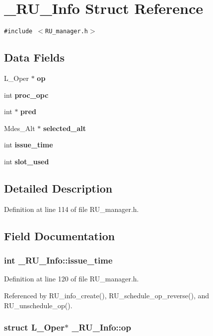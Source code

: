 \section{\_\-RU\_\-Info Struct Reference}
\label{struct__RU__Info}
{\tt \#include $<$RU\_\-manager.h$>$}

\subsection*{Data Fields}
\begin{CompactItemize}
\item 
L\_\-Oper $\ast$ \bf{op}
\item 
int \bf{proc\_\-opc}
\item 
int $\ast$ \bf{pred}
\item 
Mdes\_\-Alt $\ast$ \bf{selected\_\-alt}
\item 
int \bf{issue\_\-time}
\item 
int \bf{slot\_\-used}
\end{CompactItemize}


\subsection{Detailed Description}




Definition at line 114 of file RU\_\-manager.h.

\subsection{Field Documentation}
\subsubsection{\setlength{\rightskip}{0pt plus 5cm}int \bf{\_\-RU\_\-Info::issue\_\-time}}\label{struct__RU__Info_ed9ba01a26407d816a111fa87bf3774f}




Definition at line 120 of file RU\_\-manager.h.

Referenced by RU\_\-info\_\-create(), RU\_\-schedule\_\-op\_\-reverse(), and RU\_\-unschedule\_\-op().
\subsubsection{\setlength{\rightskip}{0pt plus 5cm}struct L\_\-Oper$\ast$ \bf{\_\-RU\_\-Info::op}}\label{struct__RU__Info_0fbe3df378ce5b4a285c286f2f9186cc}




